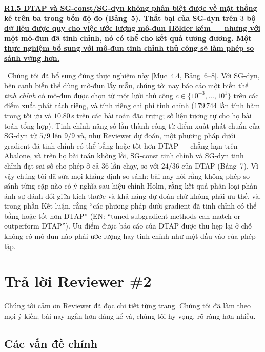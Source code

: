 \documentclass[11pt]{article}
\newcommand{\response}[1]{\smallskip\noindent{\color{blue!60!black}\textbf{Trả lời.}}\ #1\par\medskip}
\newcommand{\loc}[1]{\textcolor{blue!50!black}{[#1]}}
\newcommand{\en}[1]{{\color{gray}\small(EN: ``#1'')}}
\newenvironment{point}[1]{\medskip\noindent\textbf{\uline{#1}}\par}{\par}
\begin{document}
\begin{point}{R1.5 DTAP và SG-const/SG-dyn không phân biệt được về mặt thống kê trên ba
trong bốn độ đo (Bảng~5). Thất bại của SG-dyn trên $3$ bộ dữ liệu được quy cho việc ước lượng
mô-đun H\"older kém --- nhưng với một mô-đun đã tinh chỉnh, nó có thể cho kết quả tương đương. Một
thực nghiệm bổ sung với mô-đun tinh chỉnh thủ công sẽ làm phép so sánh vững hơn.}
\response{Chúng tôi đã bổ sung đúng thực nghiệm này \loc{Mục~4.4, Bảng~6--8}. Với SG-dyn, bên cạnh
biến thể dùng mô-đun lấy mẫu, chúng tôi nay báo cáo một biến thể \emph{tinh chỉnh} có mô-đun được
chọn từ một lưới thủ công $c\in\{10^{-3},\dots,10^{1}\}$ trên các điểm xuất phát tách riêng, và
tính riêng chi phí tinh chỉnh ($179\,744$ lần tính hàm trong tối ưu và
$10.80$\,s trên các bài toán đặc trưng; số liệu tương tự cho họ bài toán tổng hợp). Tinh chỉnh
nâng số lần thành công từ điểm xuất phát chuẩn của SG-dyn từ $5/9$ lên $9/9$ và, như Reviewer
dự đoán, một phương pháp dưới gradient đã tinh chỉnh có thể bằng hoặc tốt hơn DTAP --- chẳng hạn trên Abalone,
và trên họ bài toán không lồi, SG-const tinh chỉnh và SG-dyn tinh chỉnh đạt sai số cho phép ở cả
$36$ lần chạy, so với $24/36$ của DTAP (Bảng~7). Vì vậy chúng tôi đã sửa mọi khẳng định
so sánh: bài nay nói rằng không phép so sánh từng cặp nào có ý nghĩa sau hiệu chỉnh
Holm, rằng kết quả phân loại phản ánh sự đánh đổi giữa kích thước và khả năng dự đoán chứ không phải
ưu thế, và, trong phần Kết luận, rằng ``các phương pháp dưới gradient đã tinh chỉnh có thể bằng hoặc tốt hơn
DTAP'' \en{tuned subgradient methods can match or outperform
DTAP}. Ưu điểm được báo cáo của DTAP được thu hẹp lại ở chỗ không có mô-đun nào phải ước lượng hay
tinh chỉnh như một đầu vào của phép lặp.}
\end{point}

\section*{Trả lời Reviewer \#2}

\noindent Chúng tôi cảm ơn Reviewer đã đọc chi tiết từng trang. Chúng tôi đã làm theo
mọi ý kiến; bài nay ngắn hơn đáng kể và, chúng tôi hy vọng, rõ ràng hơn nhiều.

\subsection*{Các vấn đề chính}
\end{document}
